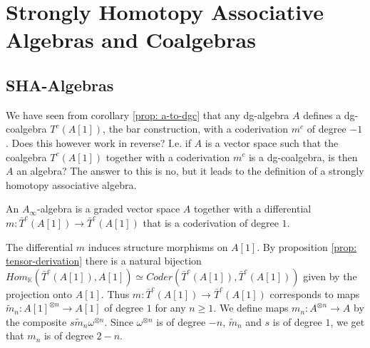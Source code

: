 \documentclass[../thesis.tex]{subfiles}
\begin{document}


    \section{Strongly Homotopy Associative Algebras and Coalgebras}\label{sec: 1.3}
    \subsection{SHA-Algebras}
        We have seen from corollary \ref{prop: a-to-dgc} that any dg-algebra $A$ defines a dg-coalgebra $T^c(A[1])$, the bar construction, with a coderivation $m^c$ of degree $-1$. Does this however work in reverse? I.e. if $A$ is a vector space such that the coalgebra $T^c(A[1])$ together with a coderivation $m^c$ is a dg-coalgebra, is then $A$ an algebra? The answer to this is no, but it leads to the definition of a strongly homotopy associative algebra.

        \begin{definition}
            An $A_\infty$-algebra is a graded vector space $A$ together with a differential $m:\bar{T}^c(A[1])\rightarrow\bar{T}^c(A[1])$ that is a coderivation of degree $1$.
        \end{definition}

        The differential $m$ induces structure morphisms on $A[1]$. By proposition \ref{prop: tensor-derivation} there is a natural bijection $Hom_\mathbb{K}(\bar{T}^c(A[1]),A[1])\simeq Coder(\bar{T}^c(A[1]),\bar{T}^c(A[1]))$ given by the projection onto $A[1]$. Thus $m:\bar{T}^c(A[1])\rightarrow\bar{T}^c(A[1])$ corresponds to maps $\widetilde{m}_n:A[1]^{\otimes n}\rightarrow A[1]$ of degree $1$ for any $n\geq 1$. We define maps $m_n : A^{\otimes n}\rightarrow A$ by the composite $s\widetilde{m}_n \omega^{\otimes n}$. Since $\omega^{\otimes n}$ is of degree $-n$, $\widetilde{m}_n$ and $s$ is of degree $1$, we get that $m_n$ is of degree $2-n$.
        \begin{center}
        \end{center}
\end{document}
